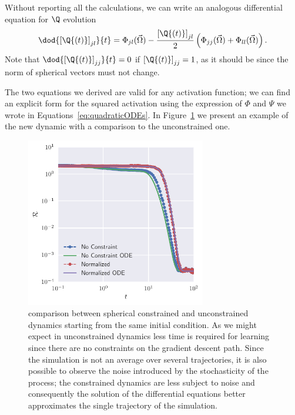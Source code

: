 Without reporting all the calculations, we can write an analogous differential equation for \(\Q\) evolution
\begin{equation} \label{eq:genericsphericalQ}
  \dod{\left[\Q{\left(t\right)}\right]_{jl}}{t} = \Phi_{jl}{(\vec{\Omega})} - \frac{\left[\Q{\left(t\right)}\right]_{jl}}{2}\left(\Phi_{jj}{(\vec{\Omega})}+\Phi_{ll}{(\vec{\Omega})}\right).
\end{equation}
Note that \(\dod{\left[\Q{\left(t\right)}\right]_{jj}}{t}=0\) if \(\left[\Q{\left(t\right)}\right]_{jj}=1\),
as it should be since the norm of spherical vectors must not change.

The two equations we derived are valid for any activation function; we can find an explicit form for the squared activation using
the expression of \(\Phi\) and \(\Psi\) we wrote in Equations~\eqref{eq:quadraticODEs}.
In Figure~\ref{fig:example-spherical} we present an example of the new dynamic
with a comparison to the unconstrained one.
\begin{figure}
  \centering
  \includegraphics[width=0.7\textwidth]{figures/example-spherical.pdf}
  \caption{
    comparison between spherical constrained and unconstrained dynamics starting from the same initial condition.
    As we might expect in unconstrained dynamics less time is required for learning since
    there are no constraints on the gradient descent path.
    Since the simulation is not an average over several trajectories,
    it is also possible to observe the noise introduced by the stochasticity of the process;
    the constrained dynamics are less subject to noise and consequently the solution of the differential equations
    better approximates the single trajectory of the simulation.
  }
  \label{fig:example-spherical}
\end{figure}

